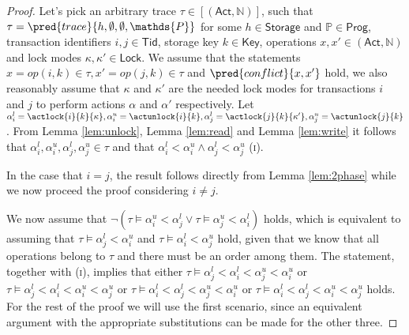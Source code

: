 \begin{proof}
Let's pick an arbitrary trace $\tau \in [(\mathsf{Act}, \mathds{N})]$, such that $\tau = \pred{trace}{h, \emptyset, \emptyset, \mathds{P}}$ for some $h \in \mathsf{Storage}$ and $\mathds{P} \in \mathsf{Prog}$, transaction identifiers $i, j \in \mathsf{Tid}$, storage key $k \in \mathsf{Key}$, operations $x, x' \in (\mathsf{Act}, \mathds{N})$ and lock modes $\kappa, \kappa' \in \mathsf{Lock}$. We assume that the statements $x = op(i, k) \in \tau, x' = op(j, k) \in \tau$ and $\pred{conflict}{x, x'}$ hold, we also reasonably assume that $\kappa$ and $\kappa'$ are the needed lock modes for transactions $i$ and $j$ to perform actions $\alpha$ and $\alpha'$ respectively. Let $\alpha_i^l = \actlock{i}{k}{\kappa}, \alpha_i^u = \actunlock{i}{k}, \alpha_j^l = \actlock{j}{k}{\kappa'}, \alpha_j^u = \actunlock{j}{k}$. From Lemma \ref{lem:unlock}, Lemma \ref{lem:read} and Lemma \ref{lem:write} it follows that $\alpha_i^l, \alpha_i^u, \alpha_j^l, \alpha_j^u \in \tau$ and that $\alpha_i^l < \alpha_i^u \land \alpha_j^l < \alpha_j^u$ (\textsc{i}).

In the case that $i = j$, the result follows directly from Lemma \ref{lem:2phase} while we now proceed the proof considering $i \neq j$.

We now assume that $\lnot \left( \tau \vDash \alpha_i^u < \alpha_j^l  \lor \tau \vDash \alpha_j^u < \alpha_i^l \right)$ holds, which is equivalent to assuming that $\tau \vDash \alpha_j^l < \alpha_i^u$ and $\tau \vDash \alpha_i^l < \alpha_j^u$ hold, given that we know that all operations belong to $\tau$ and there must be an order among them. The statement, together with (\textsc{i}), implies that either $\tau \vDash \alpha_j^l < \alpha_i^l < \alpha_j^u < \alpha_i^u$ or $\tau \vDash \alpha_j^l < \alpha_i^l < \alpha_i^u < \alpha_j^u$ or $\tau \vDash \alpha_i^l < \alpha_j^l < \alpha_j^u < \alpha_i^u$ or $\tau \vDash \alpha_i^l < \alpha_j^l < \alpha_i^u < \alpha_j^u$ holds. For the rest of the proof we will use the first scenario, since an equivalent argument with the appropriate substitutions can be made for the other three.


\end{proof}
